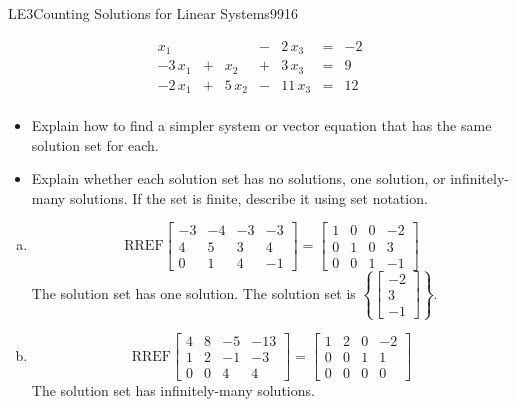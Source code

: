 \begin{exercise}{LE3}{Counting Solutions for Linear Systems}{9916}
\begin{exerciseStatement}
\begin{enumerate}[(a)]
 \[
              \begin{matrix}
 x_{1} &  &  &  -  & 2 \, x_{3} & = & -2 \\
 -3 \, x_{1} &  +  & x_{2} &  +  & 3 \, x_{3} & = & 9 \\
 -2 \, x_{1} &  +  & 5 \, x_{2} &  -  & 11 \, x_{3} & = & 12 \\
 \end{matrix}
            \] 

 
\end{enumerate}

     

\begin{itemize}
\item  

 Explain how to find a simpler system or vector equation that has the same solution set for each. 

 
\item  

 Explain whether each solution set has no solutions, one solution, or infinitely-many solutions. If the set is finite, describe it using set notation. 

 
\end{itemize}

     \end{exerciseStatement}
 \begin{exerciseAnswer} 

\begin{enumerate}[(a)]
\item  

 \[\mathrm{RREF}\left[\begin{array}{ccc|c}
-3 & -4 & -3 & -3 \\
4 & 5 & 3 & 4 \\
0 & 1 & 4 & -1
\end{array}\right]=\left[\begin{array}{ccc|c}
1 & 0 & 0 & -2 \\
0 & 1 & 0 & 3 \\
0 & 0 & 1 & -1
\end{array}\right]\] The solution set has one solution. The solution set is \(\left\{ \left[\begin{array}{c}
-2 \\
3 \\
-1
\end{array}\right] \right\}\). 

 
\item  

 \[\mathrm{RREF}\left[\begin{array}{ccc|c}
4 & 8 & -5 & -13 \\
1 & 2 & -1 & -3 \\
0 & 0 & 4 & 4
\end{array}\right]=\left[\begin{array}{ccc|c}
1 & 2 & 0 & -2 \\
0 & 0 & 1 & 1 \\
0 & 0 & 0 & 0
\end{array}\right]\] The solution set has infinitely-many solutions. 


\end{enumerate}
\end{exerciseAnswer}
\end{exercise}

